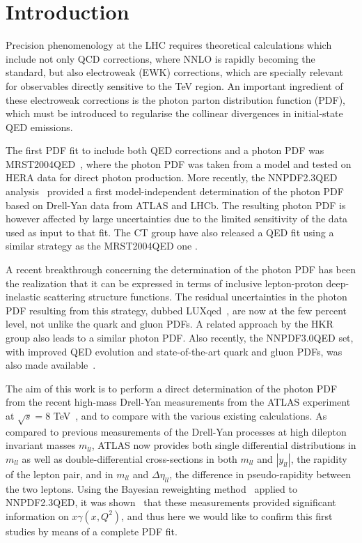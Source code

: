 \section{Introduction}

Precision phenomenology at the LHC requires theoretical calculations which
include not only QCD corrections, where NNLO is rapidly becoming
the standard, but also electroweak (EWK) corrections, which are
specially relevant for observables directly sensitive to the TeV region.
%
An important ingredient of these electroweak corrections is
the photon parton distribution function (PDF), which must
be introduced
to regularise the collinear divergences in initial-state QED emissions.

The first PDF fit to include both QED corrections and a photon PDF
was MRST2004QED~\cite{Martin:2004dh},
where the photon PDF was taken from a model
and tested on HERA data for direct photon production.
%
More recently, the NNPDF2.3QED analysis~\cite{Ball:2013hta}
provided a first model-independent
determination of the photon PDF based on Drell-Yan data
from ATLAS and LHCb.
%
The resulting photon PDF is however affected by large uncertainties
due to the limited sensitivity of the data used as input to that
fit.
%
The CT group have also released a QED fit using a similar strategy
as the MRST2004QED one \cite{Schmidt:2014aba}.

A recent breakthrough concerning the determination of the
photon PDF has been the realization that it can be expressed
in terms of inclusive lepton-proton deep-inelastic scattering
structure functions.
%
The residual uncertainties in the photon PDF resulting from
this strategy, dubbed LUXqed~\cite{Manohar:2016nzj}, are now at the few percent level,
not unlike the quark and gluon PDFs.
%
A related approach by the HKR~\cite{Harland-Lang:2016apc}
group also leads to a similar photon PDF.
%
Also recently, the NNPDF3.0QED set, with improved
QED evolution and state-of-the-art quark and gluon
PDFs, was also made available~\cite{Bertone:2016ume,Ball:2014uwa}.

The aim of this work is to perform a direct determination
of the photon PDF from the recent high-mass Drell-Yan measurements
from the ATLAS experiment at $\sqrt{s}=8$ TeV~\cite{Aad:2016zzw},
and to compare
with the various existing calculations.
%
As compared to previous measurements of the Drell-Yan processes
at high dilepton invariant masses $m_{ll}$, ATLAS now provides
both single differential distributions in $m_{ll}$ as well
as double-differential cross-sections in both $m_{ll}$
and $|y_{ll}|$, the rapidity of the lepton pair,
and in  $m_{ll}$ and $\Delta\eta_{ll}$, the difference in pseudo-rapidity
between the two leptons.
%
Using the Bayesian reweighting method~\cite{Ball:2011gg,Ball:2010gb}
applied to NNPDF2.3QED, it was shown~\cite{Aad:2016zzw}
that these measurements provided significant
information on $x\gamma(x,Q^2)$, and thus here we would
like to confirm this first studies by means of a complete PDF fit.

